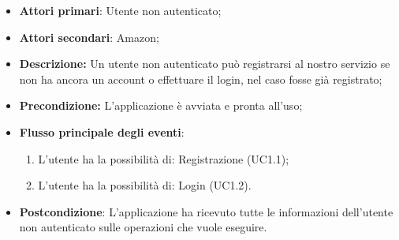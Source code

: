 \begin{itemize}
	\item \textbf{Attori primari}: Utente non autenticato;
	\item \textbf{Attori secondari}: Amazon;
	\item \textbf{Descrizione:} Un utente non  autenticato può registrarsi al nostro servizio se non ha ancora un account o effettuare il login, nel caso fosse già registrato;
	\item \textbf{Precondizione:} L'applicazione è avviata e pronta all'uso;
	\item \textbf{Flusso principale degli eventi}:
	\begin{enumerate}
		\item L'utente ha la possibilità di: Registrazione (UC1.1);
		\item L'utente ha la possibilità di: Login (UC1.2).
	\end{enumerate}
	\item \textbf{Postcondizione}: L'applicazione ha ricevuto tutte le informazioni dell'utente non autenticato sulle operazioni che vuole eseguire.
\end{itemize}

